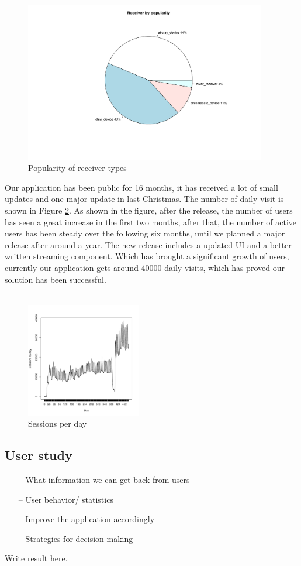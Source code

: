 \begin{figure}[htb]
\centering \includegraphics[height=7cm]{charts/receiver_popularity}
\caption{Popularity of receiver types \label{receiver_types}}
\end{figure}
Our application has been public for 16 months, it has received a lot of small updates and one major update in last Christmas. The number of daily visit is shown in Figure \ref{sessions_perday}. As shown in the figure, after the release, the number of users has seen a great increase in the first two months, after that, the number of active users has been steady over the following six months, until we planned a major release after around a year. The new release includes a updated UI and a better written streaming component. Which has brought a significant growth of users, currently our application gets around 40000 daily visits, which has proved our solution has been successful.\\
\\
\begin{figure}[htb]
\centering \includegraphics[height=5cm]{charts/sessions_per_day}
\caption{Sessions per day \label{sessions_perday}}
\end{figure}

\subsection{User study}
\begin{itemize}
\item[--]What information we can get back from users
\item[--]User behavior/ statistics
\item[--]Improve the application accordingly
\item[--]Strategies for decision making
\end{itemize}
Write result here.